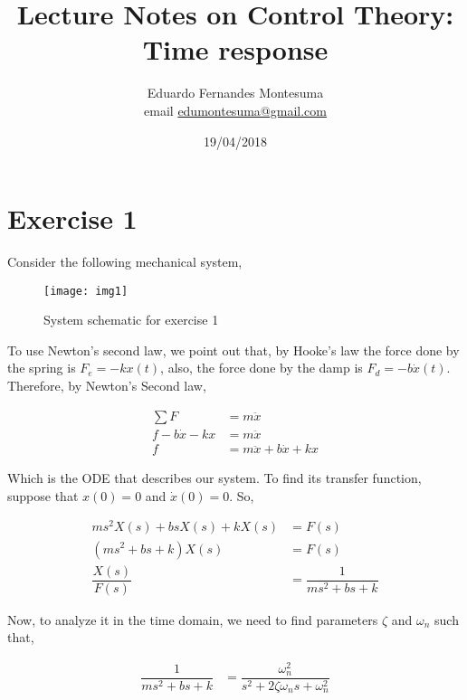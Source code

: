 \documentclass[12pt]{article}
\begin{document}
	\title{Lecture Notes on Control Theory: Time response}
	
	\vskip0.8cm
	
	\author{Eduardo Fernandes 
		Montesuma \\ email \href{mailto:edumontesuma@gmail.com}{edumontesuma@gmail.com}}
	
	\date{19/04/2018}
	
	\maketitle
	
	\tableofcontents
	
	\newpage
	
	\section{Exercise 1}
		Consider the following mechanical system,
		
		\begin{figure}[H]
			\centering
			\texttt{[image: img1]}
			\caption{System schematic for exercise 1}
			\label{Figure 1}
		\end{figure}
	
		To use Newton's second law, we point out that, by Hooke's law the force done by the spring is $F_{e} = -kx(t)$, also, the force done by the damp is $F_{d} = -b\dot{x}(t)$. Therefore, by Newton's Second law,
		
		\begin{align*}
			\sum F &= m\ddot{x}\\
			f -b\dot{x} - kx &= m\ddot{x}\\
			f &= m\ddot{x} + b\dot{x} + kx
		\end{align*}
		
		Which is the ODE that describes our system. To find its transfer function, suppose that $x(0) = 0$ and $\dot{x}(0) = 0$. So,
		
		\begin{align*}
			ms^{2}X(s) + bsX(s) + kX(s) &= F(s)\\
			(ms^{2} + bs + k)X(s) &= F(s)\\
			\dfrac{X(s)}{F(s)} &= \dfrac{1}{ms^{2} + bs + k}
		\end{align*}
		
		Now, to analyze it in the time domain, we need to find parameters $\zeta$ and $\omega_{n}$ such that,
		
		\begin{align*}
			\dfrac{1}{ms^{2} + bs + k} &= \dfrac{\omega_{n}^{2}}{s^{2} + 2\zeta \omega_{n}s + \omega_{n}^{2}}
		\end{align*}
		
\end{document}
